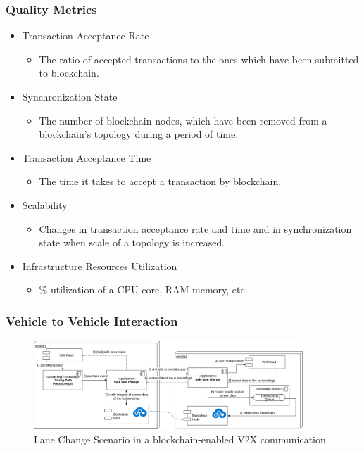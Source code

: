 \documentclass{beamer}
\begin{document}
	\begin{frame}
	\frametitle{Quality Metrics}
		\begin{itemize}
			\item Transaction Acceptance Rate
			\begin{itemize}
				\item The ratio of accepted transactions to the ones which have been submitted to blockchain.
			\end{itemize}
			\item Synchronization State
			\begin{itemize}
				\item The number of blockchain nodes, which have been removed from a blockchain’s topology
				during a period of time.
			\end{itemize}
			\item Transaction Acceptance Time
			\begin{itemize}
				\item The time it takes to accept a transaction by blockchain.
			\end{itemize}
			\item Scalability
			\begin{itemize}
				\item Changes in transaction acceptance rate and time and in synchronization state when scale of a topology is increased.
			\end{itemize}
			\item Infrastructure Resources Utilization
			\begin{itemize}
				\item \% utilization of a CPU core, RAM memory, etc.
			\end{itemize}
		\end{itemize}
	\end{frame}

	\begin{frame}
		\frametitle{Vehicle to Vehicle Interaction}
		\begin{figure}
			\centering
			\includegraphics[width=0.9\textwidth]{figures/bc_interactions/bc_v2v_interaction.png}
			\caption{Lane Change Scenario in a blockchain-enabled \gls{V2X} communication}
			\label{fig:interaction_v2v}
		\end{figure}
	\end{frame}
\end{document}
